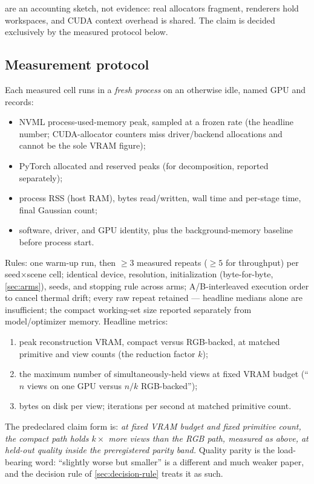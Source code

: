  are an accounting sketch, not evidence: real allocators
fragment, renderers hold workspaces, and CUDA context overhead is shared.  The claim is
decided exclusively by the measured protocol below.

\subsection{Measurement protocol}
\label{sec:protocol}

Each measured cell runs in a \emph{fresh process} on an otherwise idle, named GPU and
records:
\begin{itemize}[leftmargin=1.6em,itemsep=1pt]
  \item NVML process-used-memory peak, sampled at a frozen rate (the headline number;
        CUDA-allocator counters miss driver/backend allocations and cannot be the sole VRAM
        figure);
  \item PyTorch allocated and reserved peaks (for decomposition, reported separately);
  \item process RSS (host RAM), bytes read/written, wall time and per-stage time, final
        Gaussian count;
  \item software, driver, and GPU identity, plus the background-memory baseline before
        process start.
\end{itemize}
Rules: one warm-up run, then $\ge 3$ measured repeats ($\ge 5$ for throughput) per
seed$\times$scene cell; identical device, resolution, initialization (byte-for-byte,
\cref{sec:arms}), seeds, and stopping rule across arms; A/B-interleaved execution order to
cancel thermal drift; every raw repeat retained --- headline medians alone are insufficient;
the compact working-set size reported separately from model/optimizer memory.  Headline
metrics:
\begin{enumerate}[leftmargin=1.6em,itemsep=1pt]
  \item peak reconstruction VRAM, compact versus RGB-backed, at matched primitive and view
        counts (the reduction factor $k$);
  \item the maximum number of simultaneously-held views at fixed VRAM budget (``$n$ views on
        one GPU versus $n/k$ RGB-backed'');
  \item bytes on disk per view; iterations per second at matched primitive count.
\end{enumerate}
The predeclared claim form is: \emph{at fixed VRAM budget and fixed primitive count, the
compact path holds $k\times$ more views than the RGB path, measured as above, at held-out
quality inside the preregistered parity band.}  Quality parity is the load-bearing word:
``slightly worse but smaller'' is a different and much weaker paper, and the decision rule of
\cref{sec:decision-rule} treats it as such.

